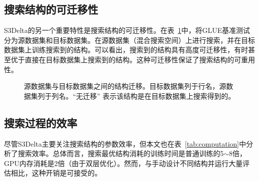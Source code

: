 \subsection{搜索结构的可迁移性}
S3Delta的另一个重要特性是搜索结构的可迁移性。在表~\ref{tab:transfer}中，将GLUE基准测试分为源数据集和目标数据集。在源数据集（混合搜索空间）上进行搜索，并在目标数据集上训练搜索到的结构。可以看出，搜索到的结构具有高度可迁移性，有时甚至优于直接在目标数据集上搜索到的结构。这种可迁移性保证了搜索结构的可重用性。

\begin{figure}
\caption{源数据集与目标数据集之间的结构迁移。目标数据集列于行名，源数据集列于列名。“无迁移” 表示该结构是在目标数据集上搜索得到的。 }
\centering
\label{tab:transfer}
\end{figure}



\subsection{搜索过程的效率}
尽管S3Delta主要关注搜索结构的参数效率，但本文也在表~\ref{tab:computation}中分析了搜索效率。总体而言，搜索最优结构消耗的训练时间是普通训练的5$\sim$8倍，GPU内存消耗是2倍（由于双层优化）。然而，与手动设计不同结构并运行大量评估相比，这种开销是可接受的。


